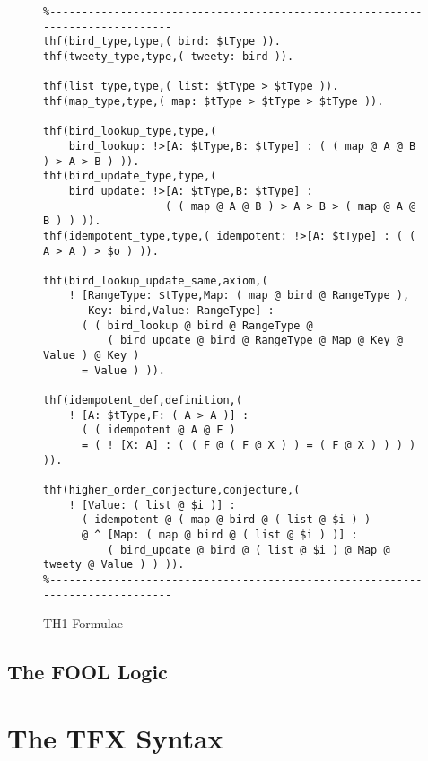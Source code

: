 \documentclass{easychair}
\begin{document}
\begin{figure}[htbp]
\begin{small}
\begin{verbatim}
%------------------------------------------------------------------------------
thf(bird_type,type,( bird: $tType )).
thf(tweety_type,type,( tweety: bird )).

thf(list_type,type,( list: $tType > $tType )).
thf(map_type,type,( map: $tType > $tType > $tType )).

thf(bird_lookup_type,type,(
    bird_lookup: !>[A: $tType,B: $tType] : ( ( map @ A @ B ) > A > B ) )).
thf(bird_update_type,type,(
    bird_update: !>[A: $tType,B: $tType] :
                   ( ( map @ A @ B ) > A > B > ( map @ A @ B ) ) )).
thf(idempotent_type,type,( idempotent: !>[A: $tType] : ( ( A > A ) > $o ) )).

thf(bird_lookup_update_same,axiom,(
    ! [RangeType: $tType,Map: ( map @ bird @ RangeType ),
       Key: bird,Value: RangeType] :
      ( ( bird_lookup @ bird @ RangeType @
          ( bird_update @ bird @ RangeType @ Map @ Key @ Value ) @ Key )
      = Value ) )).

thf(idempotent_def,definition,(
    ! [A: $tType,F: ( A > A )] :
      ( ( idempotent @ A @ F )
      = ( ! [X: A] : ( ( F @ ( F @ X ) ) = ( F @ X ) ) ) ) )).

thf(higher_order_conjecture,conjecture,(
    ! [Value: ( list @ $i )] :
      ( idempotent @ ( map @ bird @ ( list @ $i ) )
      @ ^ [Map: ( map @ bird @ ( list @ $i ) )] :
          ( bird_update @ bird @ ( list @ $i ) @ Map @ tweety @ Value ) ) )).
%------------------------------------------------------------------------------
\end{verbatim}
\end{small}
\caption{TH1 Formulae}
\label{TH1Example}
\end{figure}

\subsection{The FOOL Logic}
\label{FOOL}

\section{The TFX Syntax}
\label{TFX}

\end{document}
